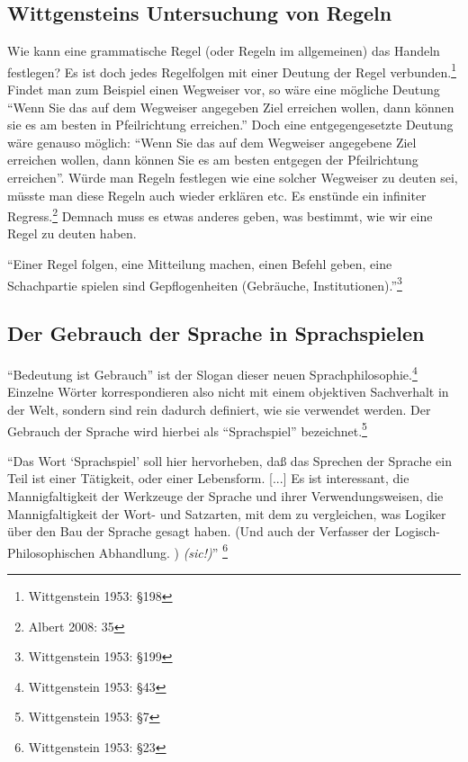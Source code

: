 \documentclass[10pt,a4paper]{article}
\begin{document}
\subsection{Wittgensteins Untersuchung von Regeln}
Wie kann eine grammatische Regel (oder Regeln im allgemeinen) das Handeln festlegen? Es ist doch jedes Regelfolgen mit einer Deutung der Regel verbunden.\footnote{Wittgenstein 1953: §198} \\
Findet man zum Beispiel einen Wegweiser vor, so wäre eine mögliche Deutung \enquote{Wenn Sie das auf dem Wegweiser angegeben Ziel erreichen wollen, dann können sie es am besten in Pfeilrichtung erreichen.} Doch eine entgegengesetzte Deutung wäre genauso möglich: \enquote{Wenn Sie das auf dem Wegweiser angegebene Ziel erreichen wollen, dann können Sie es am besten entgegen der Pfeilrichtung erreichen}. Würde man Regeln festlegen wie eine solcher Wegweiser zu deuten sei, müsste man diese Regeln auch wieder erklären etc. Es enstünde ein infiniter Regress.\footnote{Albert 2008: 35} Demnach muss es etwas anderes geben, was bestimmt, wie wir eine Regel zu deuten haben.

\begin{displayquote}
\enquote{Einer Regel folgen, eine Mitteilung machen, einen Befehl geben, eine Schachpartie spielen sind Gepflogenheiten (Gebräuche, Institutionen).}\footnote{Wittgenstein 1953: §199}
\end{displayquote}


\subsection{Der Gebrauch der Sprache in Sprachspielen}
\enquote{Bedeutung ist Gebrauch} ist der Slogan dieser neuen Sprachphilosophie.\footnote{Wittgenstein 1953: §43} Einzelne Wörter korrespondieren also nicht mit einem objektiven Sachverhalt in der Welt, sondern sind rein dadurch definiert, wie sie verwendet werden. Der Gebrauch der Sprache wird hierbei als \enquote{Sprachspiel} bezeichnet.\footnote{Wittgenstein 1953: §7}

\begin{displayquote}
\enquote{Das Wort \enquote{Sprachspiel} soll hier hervorheben, daß das Sprechen
der Sprache ein Teil ist einer Tätigkeit, oder einer Lebensform. [...]
Es ist interessant, die Mannigfaltigkeit der Werkzeuge der Sprache
und ihrer Verwendungsweisen, die Mannigfaltigkeit der Wort- und
Satzarten, mit dem zu vergleichen, was Logiker über den Bau der
Sprache gesagt haben. (Und auch der Verfasser der Logisch-Philosophischen Abhandlung. ) \textit{(sic!)}} \footnote{Wittgenstein 1953: §23}
\end{displayquote}
\end{document}
